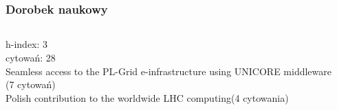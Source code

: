 \documentclass{beamer}
\begin{document}
\section{}

\begin{frame}
	\frametitle{Dorobek naukowy}
	\begin{columns}
		\begin{column}{0.5\textwidth}
			h-index: 3 \\
			cytowań: 28 \\
			Seamless access to the PL-Grid e-infrastructure using UNICORE middleware (7 cytowań)\\
			Polish contribution to the worldwide LHC computing(4 cytowania)\\
		\end{column}
		\begin{column}{0.5\textwidth}
			\cite{Stolarek:13}\\
			\cite{Yavorskiy:14}\\
			\cite{ania2015}\\
			\cite{pastuszczak2013engineering}\\
		\end{column}
	\end{columns}
		
\end{frame}
\end{document}
